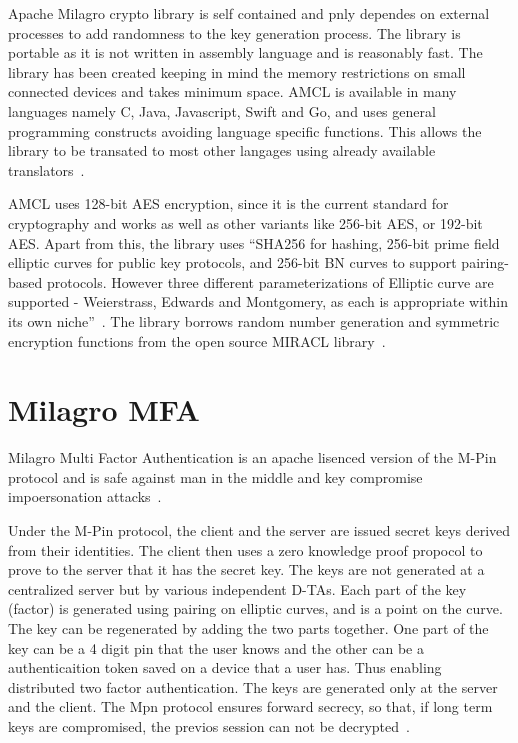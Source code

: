 Apache Milagro crypto library is self contained and pnly dependes on
external processes to add randomness to the key generation
process. The library is portable as it is not written in assembly
language and is reasonably fast. The library has been created keeping
in mind the memory restrictions on small connected devices and takes
minimum space. AMCL is available in many languages namely C, Java,
Javascript, Swift and Go, and uses general programming constructs
avoiding language specific functions. This allows the library to be
transated to most other langages using already available
translators~\cite{mcl-white-paper}.

AMCL uses 128-bit AES encryption, since it is the current standard for
cryptography and works as well as other variants like 256-bit AES, or
192-bit AES\@. Apart from this, the library uses ``SHA256 for hashing,
256-bit prime field elliptic curves for public key protocols, and
256-bit BN curves to support pairing-based protocols. However three
different parameterizations of Elliptic curve are supported -
Weierstrass, Edwards and Montgomery, as each is appropriate within its
own niche''~\cite{mcl-white-paper}. The library borrows random number
generation and symmetric encryption functions from the open source
MIRACL library~\cite{mcl-white-paper}.


\section{Milagro MFA}

Milagro Multi Factor Authentication is an apache lisenced version of
the M-Pin protocol and is safe against man in the middle and key
compromise impoersonation attacks~\cite{milagro-mfa}.

Under the M-Pin protocol, the client and the server are issued secret
keys derived from their identities. The client then uses a zero
knowledge proof propocol to prove to the server that it has the secret
key. The keys are not generated at a centralized server but by various
independent D-TAs. Each part of the key (factor) is generated using
pairing on elliptic curves, and is a point on the curve. The key can
be regenerated by adding the two parts together. One part of the key
can be a 4 digit pin that the user knows and the other can be a
authenticaition token saved on a device that a user has. Thus enabling
distributed two factor authentication. The keys are generated only at
the server and the client. The Mpn protocol ensures forward secrecy,
so that, if long term keys are compromised, the previos session can
not be decrypted~\cite{milagro-protocols}.


